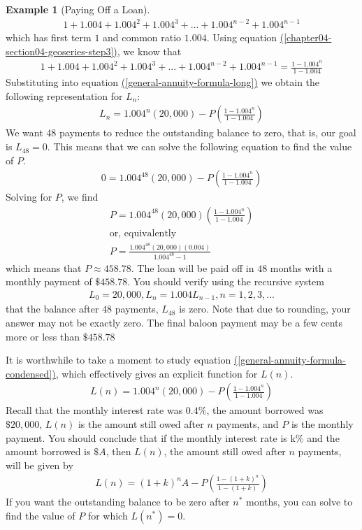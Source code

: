 \documentclass[10pt,]{book}
\theoremstyle{plain}
\theoremstyle{definition}
\theoremstyle{definition}
\newtheorem{example}[theorem]{Example}
\theoremstyle{definition}
\numberwithin{equation}{section}
\begin{document}
\begin{example}[Paying Off a Loan]
%
\begin{gather*}
1 + 1.004 + 1.004^2 + 1.004^3 + ... + 1.004^{n-2} + 1.004^{n-1}
\end{gather*}
which has first term \(1\) and common ratio \(1.004\). Using equation \hyperref[chapter04-section04-geoseries-step3]{(\ref{chapter04-section04-geoseries-step3})}, we know that%
%
\begin{gather*}
1 + 1.004 + 1.004^2 + 1.004^3 + ... + 1.004^{n-2} + 1.004^{n-1} = \frac{1-1.004^n}{1-1.004}
\end{gather*}
Substituting into equation \hyperref[general-annuity-formula-long]{(\ref{general-annuity-formula-long})} we obtain the following representation for  \(L_n\):%
%
\begin{gather}
L_n = 1.004^n (20,000) - P(\frac{1-1.004^n}{1-1.004})\label{general-annuity-formula-condensed}
\end{gather}
We want \(48\) payments to reduce the outstanding balance to zero, that is, our goal is  \(L_{48}=0\). This means that we can solve the following equation to find the value of \(P\).%
%
\begin{gather*}
0 = 1.004^{48}(20,000)-P(\frac{1-1.004^n}{1-1.004})
\end{gather*}
Solving for \(P\), we find%
%
\begin{gather*}
P = 1.004^{48}(20,000)(\frac{1-1.004^n}{1-1.004})\\
\text{or, equivalently}\\
P=\frac{1.004^{48}(20,000)(0.004)}{1.004^{48}-1}
\end{gather*}
which means that \(P \approx 458.78\). The loan will be paid off in \(48\) months with a monthly payment of \(\$458.78\). You should verify using the recursive system%
%
\begin{gather*}
L_0 = 20,000, L_n = 1.004L_{n-1}, n = 1, 2, 3, ...
\end{gather*}
that the balance after \(48\) payments, \(L_{48}\) is zero. Note that due to rounding, your answer may not be exactly zero. The final baloon payment may be a few cents more or less than \(\$458.78\)%
\par
It is worthwhile to take a moment to study equation \hyperref[general-annuity-formula-condensed]{(\ref{general-annuity-formula-condensed})}, which effectively gives an explicit function for \(L(n)\).%
%
\begin{gather*}
L(n) = 1.004^n (20,000) - P(\frac{1-1.004^n}{1-1.004})
\end{gather*}
Recall that the monthly interest rate was \(0.4\%\), the amount borrowed was \(\$20,000\),  \(L(n)\) is the amount still owed after \(n\) payments, and \(P\) is the monthly payment. You should conclude that if the monthly interest rate is k\% and the amount borrowed is \(\$A\), then \(L(n)\), the amount still owed after \(n\) payments, will be given by%
%
\begin{gather}
L(n) = (1+k)^n A - P(\frac{1-(1+k)^n}{1-(1+k)})\label{mrow-100}
\end{gather}
If you want the outstanding balance to be zero after \(n^*\) months, you can solve to find the value of \(P\) for which \(L(n^*)=0\).%
\end{example}
\end{document}

